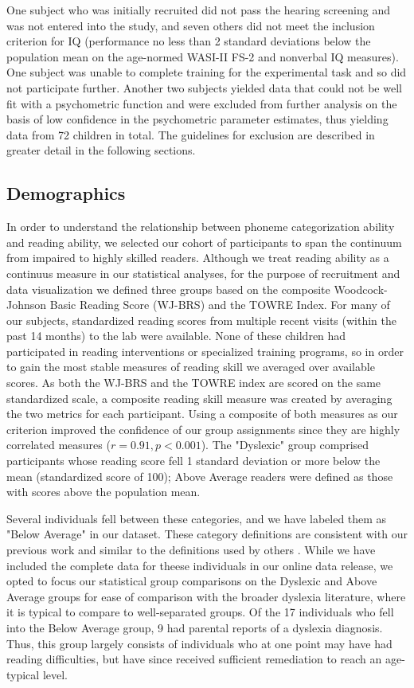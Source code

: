 \documentclass[../uwthesis.tex]{subfiles}
\begin{document}
One subject who was initially recruited did not pass the hearing screening and was not entered into the study, and seven others did not meet the inclusion criterion for IQ (performance no less than 2 standard deviations below the population mean on the age-normed WASI-II FS-2 and nonverbal IQ measures). One subject was unable to complete training for the experimental task and so did not participate further. Another two subjects yielded data that could not be well fit with a psychometric function and were excluded from further analysis on the basis of low confidence in the psychometric parameter estimates, thus yielding data from 72 children in total. The guidelines for exclusion are described in greater detail in the following sections.

\subsection{Demographics}
In order to understand the relationship between phoneme categorization ability and reading ability, we selected our cohort of participants to span the continuum from impaired to highly skilled readers. Although we treat reading ability as a continuus measure in our statistical analyses, for the purpose of recruitment and data visualization we defined three groups based on the composite Woodcock-Johnson Basic Reading Score (WJ-BRS) and the TOWRE Index. For many of our subjects, standardized reading scores from multiple recent visits (within the past 14 months) to the lab were available. None of these children had participated in reading interventions or specialized training programs, so in order to gain the most stable measures of reading skill we averaged over available scores. As both the WJ-BRS and the TOWRE index are scored on the same standardized scale, a composite reading skill measure was created by averaging the two metrics for each participant. Using a composite of both measures as our criterion improved the confidence of our group assignments since they are highly correlated measures ($r=0.91, p<0.001$). The "Dyslexic" group comprised participants whose reading score fell 1 standard deviation or more below the mean (standardized score of 100); Above Average readers were defined as those with scores above the population mean.

Several individuals fell between these categories, and we have labeled them as "Below Average" in our dataset. These category definitions are consistent with our previous work \citep{OBrien2018} and similar to the definitions used by others \citep{Rimrodt2010WhiteDyslexia,Shaywitz2002DisruptionDyslexia}. While we have included the complete data for theese individuals in our online data release, we opted to focus our statistical group comparisons on the Dyslexic and Above Average groups for ease of comparison with the broader dyslexia literature, where it is typical to compare to well-separated groups. Of the 17 individuals who fell into the Below Average group, 9 had parental reports of a dyslexia diagnosis. Thus, this group largely consists of individuals who at one point may have had reading difficulties, but have since received sufficient remediation to reach an age-typical level.
\end{document}
